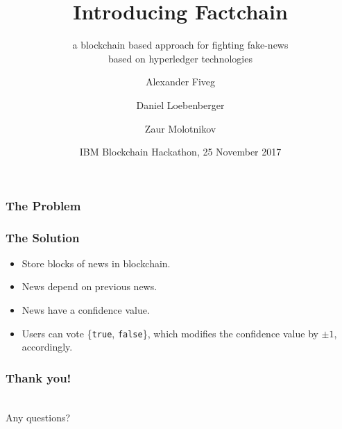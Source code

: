 \documentclass[aspectratio=169]{beamer}
\title{Introducing Factchain}
\subtitle{a blockchain based approach for fighting fake-news\\based on hyperledger technologies}
\author{Alexander Fiveg \and Daniel Loebenberger \and Zaur Molotnikov}
\institute{\texttt{\{afiveg,dloeb,zmolo\}@genua.de}}
\date{IBM Blockchain Hackathon, 25 November 2017}
\begin{document}
\frame[plain]{\titlepage}

\begin{frame}
\frametitle{The Problem}

\end{frame}

\begin{frame}
\frametitle{The Solution}

\parbox{12cm}{
\begin{minipage}[c][6cm][c]{8cm}
\begin{itemize}
\item Store blocks of news in blockchain.
\item News depend on previous news.
\item News have a confidence value.
\item Users can vote \{\texttt{true}, \texttt{false}\}, which
      modifies the confidence value by $\pm 1$, accordingly.
\end{itemize}
\end{minipage}
\hfill
\begin{minipage}[c][6cm][c]{3.5cm}
\end{minipage}
}
\end{frame}

\begin{frame}
\frametitle{Thank you!}
\begin{center}
\\
Any questions?
\begin{center}
\end{center}
\end{center}
\end{frame}
\end{document}
